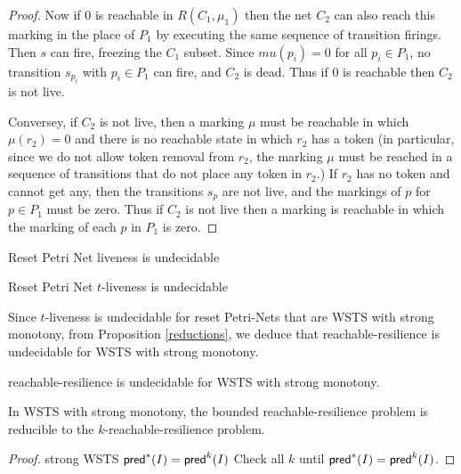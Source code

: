 \begin{proof}
Now if $0$ is reachable
in $R(C_1, \mu_1)$ 
then the net $C_2$ can also reach this marking
in the place of $P_1$ by executing the same sequence of transition firings.
Then $s$ can fire, freezing the $C_1$ subset.
Since $mu(p_i) = 0$ for all $p_i \in P_1$, no transition $s_{p_i}$ with $p_i \in P_1$ can fire, and $C_2$ is dead.
Thus if $0$ is reachable then $C_2$ is not live.

Conversey, if $C_2$ is not live, then a marking $\mu$ must be reachable in which 
$\mu(r_2) = 0$ and there is no reachable state in which $r_2$ has a token
(in particular, since we do not allow token removal from $r_2$, the marking $\mu$ must be reached in a sequence of transitions that do not place any token in $r_2$.)
If $r_2$ has no token and cannot get any, then the transitions $s_p$ are not live, and the markings of $p$ for $p \in P_1$ must be zero. 
Thus if $C_2$ is not live then a marking is reachable in which the marking of each $p$ in $P_1$ is zero. 


\end{proof}

\begin{corollary}
Reset Petri Net liveness is undecidable 
\end{corollary}

\begin{corollary}
Reset Petri Net $t$-liveness is undecidable 
\end{corollary}


Since $t$-liveness is undecidable for reset Petri-Nets that are WSTS with strong monotony, from Proposition \ref{reductions},  we deduce that reachable-resilience is undecidable for WSTS with strong monotony.

\begin{theorem}
{\sc reachable-resilience} is undecidable for WSTS with strong monotony.
\end{theorem}






\begin{proposition}
In WSTS with strong monotony, the bounded reachable-resilience problem is
reducible to the $k$-reachable-resilience problem.
\end{proposition}

\begin{proof}
strong WSTS
$\textsf{pred}^*(I) = \textsf{pred}^{k}(I)$
Check all $k$ until $\textsf{pred}^*(I) = \textsf{pred}^{k}(I)$.
\end{proof}

